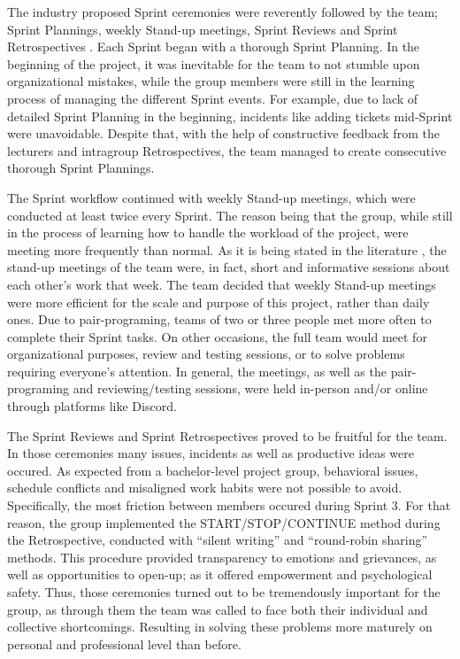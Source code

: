 The industry proposed Sprint ceremonies were reverently followed by the team; Sprint Plannings, 
weekly Stand-up meetings, Sprint Reviews and Sprint Retrospectives \cite{Adi2015}. 
Each Sprint began with a thorough Sprint Planning. 
In the beginning of the project, it was inevitable for the team to not stumble upon organizational mistakes, while the group members were still in the learning process of managing the different Sprint events. For example, due to lack of detailed Sprint Planning in the beginning, incidents like adding tickets mid-Sprint were unavoidable. Despite that, with the help of constructive feedback from the lecturers and intragroup Retrospectives, the team managed to create consecutive thorough Sprint Plannings.

The Sprint workflow continued with weekly Stand-up meetings, which were conducted at least twice every Sprint. 
The reason being that the group, while still in the process of learning how to handle the workload of the project, were meeting more frequently than normal. As it is being stated in the literature \cite{Hoegl2005}, the stand-up meetings of the team were, in fact, short and informative sessions about each other’s work that week. 
The team decided that weekly Stand-up meetings were more efficient for the scale and purpose of this project, rather than daily ones. Due to pair-programing, teams of two or three people met more often to complete their Sprint tasks. On other occasions, the full team would meet for organizational purposes, review and testing sessions, or to solve problems requiring everyone's attention. 
In general, the meetings, as well as the pair-programing and reviewing/testing sessions, were held in-person and/or online through platforms like Discord. 

The Sprint Reviews and Sprint Retrospectives proved to be fruitful for the team. 
In those ceremonies many issues, incidents as well as productive ideas were occured. 
As expected from a bachelor-level project group, behavioral issues, schedule conflicts and misaligned work habits were not possible to avoid. Specifically, the most friction between members occured during Sprint 3.
For that reason, the group implemented the START/STOP/CONTINUE method during the Retrospective, 
conducted with “silent writing” and “round-robin sharing” methods. 
This procedure provided transparency to emotions and grievances, as well as opportunities to open-up;  as it offered empowerment and psychological safety. 
Thus, those ceremonies turned out to be tremendously important for the group, 
as through them the team was called to face both their individual and collective shortcomings. 
Resulting in solving these problems more maturely on personal and professional level than before. 


